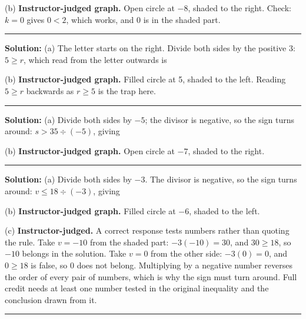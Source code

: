 \documentclass[12pt]{article}
\begin{document}
(b) \textbf{Instructor-judged graph.} Open circle at $-8$, shaded to the right. Check: $k = 0$ gives $0 < 2$, which works, and 0 is in the shaded part.

\vspace{0.2cm}\noindent\rule{\linewidth}{0.2pt}\vspace{0.2cm}


\textbf{Solution:} (a) The letter starts on the right. Divide both sides by the positive 3: $5 \geq r$, which read from the letter outwards is 

(b) \textbf{Instructor-judged graph.} Filled circle at 5, shaded to the left. Reading $5 \geq r$ backwards as $r \geq 5$ is the trap here.

\vspace{0.2cm}\noindent\rule{\linewidth}{0.2pt}\vspace{0.2cm}


\textbf{Solution:} (a) Divide both sides by $-5$; the divisor is negative, so the sign turns around: $s > 35 \div (-5)$, giving 

(b) \textbf{Instructor-judged graph.} Open circle at $-7$, shaded to the right.

\vspace{0.2cm}\noindent\rule{\linewidth}{0.2pt}\vspace{0.2cm}


\textbf{Solution:} (a) Divide both sides by $-3$. The divisor is negative, so
the sign turns around: $v \leq 18 \div (-3)$, giving 

(b) \textbf{Instructor-judged graph.} Filled circle at $-6$, shaded to the
left.

(c) \textbf{Instructor-judged.} A correct response tests numbers rather than
quoting the rule. Take $v = -10$ from the shaded part: $-3(-10) = 30$, and
$30 \geq 18$, so $-10$ belongs in the solution. Take $v = 0$ from the other
side: $-3(0) = 0$, and $0 \geq 18$ is false, so 0 does not belong. Multiplying
by a negative number reverses the order of every pair of numbers, which is why
the sign must turn around. Full credit needs at least one number tested in the
original inequality and the conclusion drawn from it.

\vspace{0.2cm}\noindent\rule{\linewidth}{0.2pt}\vspace{0.2cm}
\end{document}
